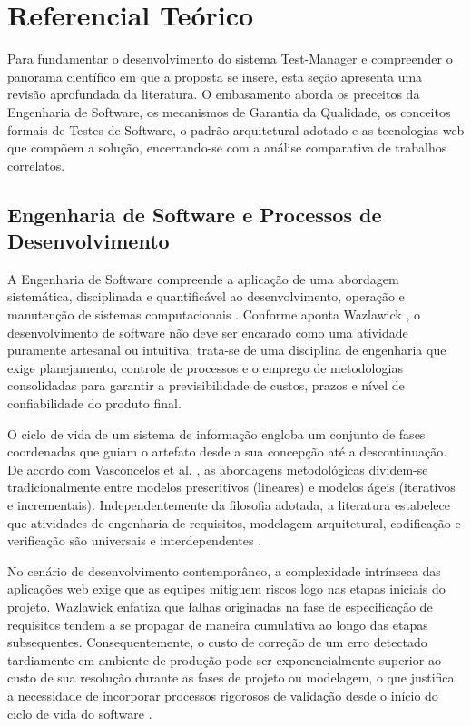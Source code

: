 \chapter{Referencial Teórico}

Para fundamentar o desenvolvimento do sistema Test-Manager e compreender o panorama científico em que a proposta se insere, esta seção apresenta uma revisão aprofundada da literatura. O embasamento aborda os preceitos da Engenharia de Software, os mecanismos de Garantia da Qualidade, os conceitos formais de Testes de Software, o padrão arquitetural adotado e as tecnologias web que compõem a solução, encerrando-se com a análise comparativa de trabalhos correlatos.

\section{Engenharia de Software e Processos de Desenvolvimento}

A Engenharia de Software compreende a aplicação de uma abordagem sistemática, disciplinada e quantificável ao desenvolvimento, operação e manutenção de sistemas computacionais \cite{vasconcelos2006}. Conforme aponta Wazlawick \cite{wazlawick2019}, o desenvolvimento de software não deve ser encarado como uma atividade puramente artesanal ou intuitiva; trata-se de uma disciplina de engenharia que exige planejamento, controle de processos e o emprego de metodologias consolidadas para garantir a previsibilidade de custos, prazos e nível de confiabilidade do produto final.

O ciclo de vida de um sistema de informação engloba um conjunto de fases coordenadas que guiam o artefato desde a sua concepção até a descontinuação. De acordo com Vasconcelos et al. \cite{vasconcelos2006}, as abordagens metodológicas dividem-se tradicionalmente entre modelos prescritivos (lineares) e modelos ágeis (iterativos e incrementais). Independentemente da filosofia adotada, a literatura estabelece que atividades de engenharia de requisitos, modelagem arquitetural, codificação e verificação são universais e interdependentes \cite{wazlawick2019}.

No cenário de desenvolvimento contemporâneo, a complexidade intrínseca das aplicações web exige que as equipes mitiguem riscos logo nas etapas iniciais do projeto. Wazlawick \cite{wazlawick2019} enfatiza que falhas originadas na fase de especificação de requisitos tendem a se propagar de maneira cumulativa ao longo das etapas subsequentes. Consequentemente, o custo de correção de um erro detectado tardiamente em ambiente de produção pode ser exponencialmente superior ao custo de sua resolução durante as fases de projeto ou modelagem, o que justifica a necessidade de incorporar processos rigorosos de validação desde o início do ciclo de vida do software \cite{vasconcelos2006, wazlawick2019}.

